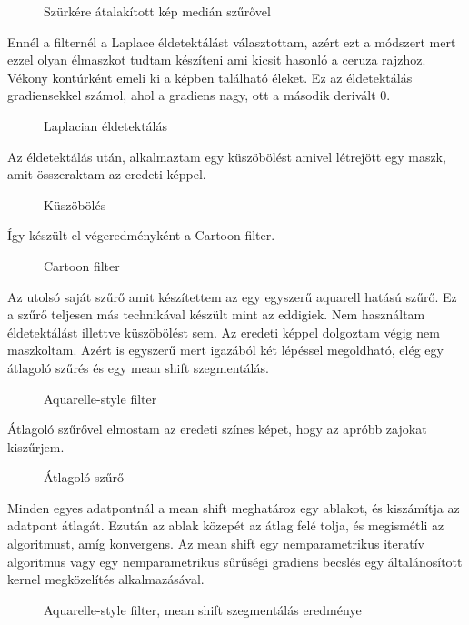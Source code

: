 \begin{figure}[ht]
\centering
{}
\caption{Szürkére átalakított kép medián szűrővel  } 
\label{fig:  2_cartoon2}
\end{figure}
Ennél a filternél a Laplace éldetektálást választottam, azért ezt a módszert mert ezzel olyan élmaszkot tudtam készíteni ami kicsit hasonló a ceruza rajzhoz. Vékony kontúrként emeli ki a képben található éleket. Ez az éldetektálás gradiensekkel számol, ahol a gradiens nagy, ott a második derivált 0.
\begin{figure}[ht]
\centering
{}
\caption{Laplacian éldetektálás  } 
\label{fig:  2_cartoon3}
\end{figure}
Az éldetektálás után, alkalmaztam egy küszöbölést amivel létrejött egy maszk, amit összeraktam az eredeti képpel.
\begin{figure}[ht]
\centering
{}
\caption{Küszöbölés  } 
\label{fig:  2_cartoon4}
\end{figure}
Így készült el végeredményként a Cartoon filter.
\begin{figure}[ht]
\centering
{}
\caption{Cartoon filter  } 
\label{fig:  2_cartoon4}
\end{figure}
\newpage
{}
Az utolsó saját szűrő amit készítettem az egy egyszerű aquarell hatású szűrő. Ez a szűrő teljesen más technikával készült mint az eddigiek. Nem használtam éldetektálást illettve küszöbölést sem. Az eredeti képpel dolgoztam végig nem maszkoltam. Azért is egyszerű mert igazából két lépéssel megoldható, elég egy átlagoló szűrés és egy mean shift szegmentálás.
\begin{figure}[ht]
\centering
{}
\caption{Aquarelle-style filter} 
\label{fig:  paint}
\end{figure}
Átlagoló szűrővel elmostam az eredeti színes képet, hogy az apróbb zajokat kiszűrjem.
\begin{figure}[ht]
\centering
{}
\caption{Átlagoló szűrő  } 
\label{fig: paint1}
\end{figure}
Minden egyes adatpontnál a mean shift meghatároz egy ablakot, és kiszámítja az adatpont átlagát. Ezután az ablak közepét az átlag felé tolja, és megismétli az algoritmust, amíg konvergens. Az mean shift egy nemparametrikus iteratív algoritmus vagy egy nemparametrikus sűrűségi gradiens becslés egy általánosított kernel megközelítés alkalmazásával.
\begin{figure}[ht]
\centering
{}
\caption{Aquarelle-style filter, mean shift szegmentálás  eredménye} 
\label{fig: paint1}
\end{figure}
